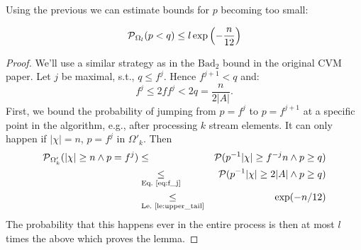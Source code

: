 Using the previous we can estimate bounds for $p$ becoming too small:
\begin{lemma}\label{le:low_p}
\[
\operatorname{\mathcal P}_{\Omega_l}(p < q) \leq l \exp\left( - \frac{n}{12}\right)
\]
\end{lemma}
\begin{proof}
We'll use a similar strategy as in the $\mathrm{Bad}_2$ bound in the original CVM paper.
Let $j$ be maximal, s.t., $q \leq f^j$. Hence $f^{j+1} < q$ and:
\begin{equation}
\label{eq:f_j}
  f^j \leq 2f f^j < 2q = \frac{n}{2|A|} \textrm{.}
\end{equation}
First, we bound the probability of jumping from $p=f^j$ to $p=f^{j+1}$ at a specific point in the
algorithm, e.g., after processing $k$ stream elements. It can only happen if $|\chi|=n$, $p=f^j$
in $\Omega'_k$. Then
\begin{eqnarray*}
  \operatorname{\mathcal P}_{\Omega'_k} ( |\chi| \geq n \wedge p=f^j) & \leq &
    \operatorname{\mathcal P}( p^{-1} |\chi| \geq f^{-j} n \wedge p \geq q) \\
    & \underset{\textrm{Eq.~\ref{eq:f_j}}}{\leq} & \operatorname{\mathcal P}( p^{-1} |\chi| \geq 2|A| \wedge p \geq q)\\
    & \underset{\textrm{Le.~\ref{le:upper_tail}}}{\leq} & \exp(- n/12)
\end{eqnarray*}
The probability that this happens ever in the entire process is then at most $l$ times the above
which proves the lemma.
\end{proof}

